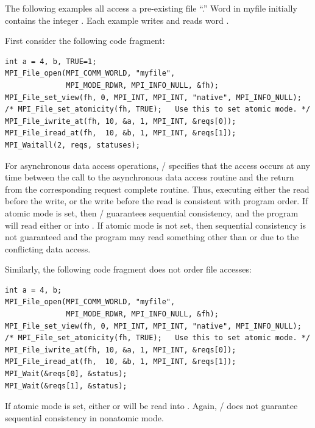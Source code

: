 \begin{example}
\label{io-asynchronousconsistency}
The following examples all access a pre-existing file ``.''
Word  in myfile initially contains the integer .
Each example writes and reads word .

First consider the following code fragment:
\begin{lstlisting}[language={[MPI]C}]
int a = 4, b, TRUE=1;
MPI_File_open(MPI_COMM_WORLD, "myfile",
              MPI_MODE_RDWR, MPI_INFO_NULL, &fh);
MPI_File_set_view(fh, 0, MPI_INT, MPI_INT, "native", MPI_INFO_NULL);
/* MPI_File_set_atomicity(fh, TRUE);   Use this to set atomic mode. */
MPI_File_iwrite_at(fh, 10, &a, 1, MPI_INT, &reqs[0]);
MPI_File_iread_at(fh,  10, &b, 1, MPI_INT, &reqs[1]);
MPI_Waitall(2, reqs, statuses);
\end{lstlisting}
For asynchronous data access operations, \MPI/ specifies 
that the access occurs at any time between the call to the asynchronous 
data access routine and the return from the corresponding 
request complete routine.
Thus, executing either the read before the write,
or the write before the read is consistent with program order.
If atomic mode is set, then \MPI/ guarantees sequential 
consistency, and the program will read either  or
 into .
If atomic mode is not set, then sequential consistency is not 
guaranteed and the program may read something other than 
or  due to the conflicting data access.

Similarly, the following code fragment does not order file accesses:
\begin{lstlisting}[language={[MPI]C}]
int a = 4, b;
MPI_File_open(MPI_COMM_WORLD, "myfile",
              MPI_MODE_RDWR, MPI_INFO_NULL, &fh);
MPI_File_set_view(fh, 0, MPI_INT, MPI_INT, "native", MPI_INFO_NULL);
/* MPI_File_set_atomicity(fh, TRUE);   Use this to set atomic mode. */
MPI_File_iwrite_at(fh, 10, &a, 1, MPI_INT, &reqs[0]);
MPI_File_iread_at(fh,  10, &b, 1, MPI_INT, &reqs[1]);
MPI_Wait(&reqs[0], &status);
MPI_Wait(&reqs[1], &status);
\end{lstlisting}
If atomic mode is set, either  or  will be read
into .  Again, \MPI/ does not guarantee sequential consistency
in nonatomic mode.


\end{example}
